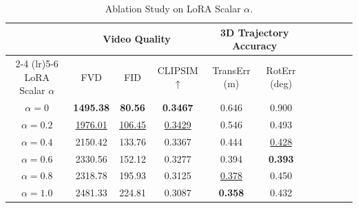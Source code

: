 \begin{table}[!ht]

\caption{Ablation Study on LoRA Scalar $\alpha$.} 
\label{tab:ablation_lora_alpha}

\centering
\begin{threeparttable}
\resizebox{.85\textwidth}{!} 
{
\begin{tabular}{ccccccccccc}
\toprule
&  \multicolumn{3}{c}{ Video Quality } & \multicolumn{2}{c}{ 3D Trajectory Accuracy } \\
\cmidrule(lr){2-4} 
\cmidrule(lr){5-6} 
LoRA Scalar $\alpha$ & FVD  & FID  & CLIPSIM $\uparrow$ & TransErr (m)  & RotErr (deg)    \\

\midrule
$\alpha=0$ & \textbf{1495.38} & \textbf{80.56} & \textbf{0.3467} & 0.646 & 0.900  \\
$\alpha=0.2$ & \underline{1976.01} & \underline{106.45} & \underline{0.3429}  & 0.546 & 0.493 \\
$\alpha=0.4$ & 2150.42 & 133.76 & 0.3367 & 0.444 & \underline{0.428}   \\
$\alpha=0.6$ & 2330.56 & 152.12 & 0.3277 & 0.394 & \textbf{0.393}  \\
$\alpha=0.8$ & 2318.78 & 195.93 & 0.3125 & \underline{0.378} & 0.450  \\
$\alpha=1.0$ & 2481.33 & 224.81 & 0.3087 & \textbf{0.358} & 0.432 \\
\bottomrule


\end{tabular}
}

\end{threeparttable}
\end{table}
